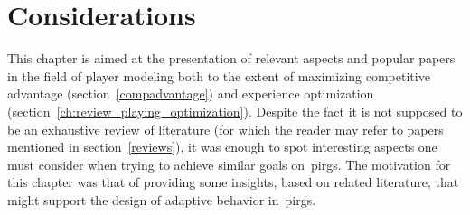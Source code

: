 \section{Considerations}

This chapter is aimed at the presentation of relevant aspects and popular papers in the field of player modeling both to the extent of maximizing competitive advantage (section~\ref{compadvantage}) and experience optimization (section~\ref{ch:review_playing_optimization}). Despite the fact it is not supposed to be an exhaustive review of literature (for which the reader may refer to papers mentioned in section~\ref{reviews}), it was enough to spot interesting aspects one must consider when trying to achieve similar goals on~\gls{pirg}s. The motivation for this chapter was that of providing some insights, based on related literature, that might support the design of adaptive behavior in~\gls{pirg}s. 
